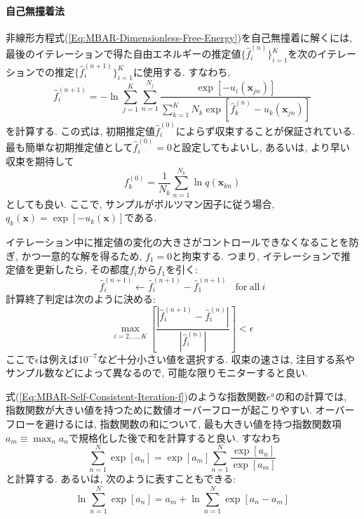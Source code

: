 \paragraph{自己無撞着法}
非線形方程式(\ref{Eq:MBAR-Dimensionless-Free-Energy})を自己無撞着に解くには, 最後のイテレーションで得た自由エネルギーの推定値$\{\hat{f}_{i}^{(n)}\}_{i=1}^{K}$を次のイテレーションでの推定$\{\hat{f}_{i}^{(n+1)}\}_{i=1}^{K}$に使用する. すなわち, 
\begin{equation}
    \hat{f}_{i}^{(n+1)}
    =
    -\ln
    \sum_{j=1}^{K} \sum_{n=1}^{N_{j}}
    \frac{
        \exp[-u_{i}(\bm{x}_{jn})]
    }{
        \sum_{k=1}^{K}
        N_{k}
        \exp[\hat{f}_{k}^{(n)} - u_{k}(\bm{x}_{jn})]
    }
\end{equation}
を計算する. 
この式は, 初期推定値$\hat{f}_{i}^{(0)}$によらず収束することが保証されている. 最も簡単な初期推定値として$\hat{f}_{i}^{(0)}=0$と設定してもよいし, あるいは, より早い収束を期待して
\begin{equation}
    f_{k}^{(0)}
    =
    \frac{1}{N_{k}}
    \sum_{n=1}^{N_{k}} \ln q(\bm{x}_{kn})
    \label{Eq:MBAR-Self-Consistent-Iteration-f}
\end{equation}
としても良い. ここで, サンプルがボルツマン因子に従う場合, $q_{k}(\bm{x}) = \exp[-u_{k}(\bm{x})]$である. 

イテレーション中に推定値の変化の大きさがコントロールできなくなることを防ぎ, かつ一意的な解を得るため, $f_{1} = 0$と拘束する. つまり, イテレーションで推定値を更新したら, その都度$f_{i}$から$f_{1}$を引く:
\begin{equation}
    \hat{f}_{i}^{(n+1)} \leftarrow \hat{f}_{i}^{(n+1)} - \hat{f}_{1}^{(n+1)}
    ~~~~\mathrm{for~all}~i
\end{equation}
計算終了判定は次のように決める:
\begin{equation}
    \max_{i=2,\ldots,K}
    \left[
        \frac{|\hat{f}_{i}^{(n+1)} - \hat{f}_{i}^{(n)}|}{|\hat{f}_{i}^{(n)}|}
    \right]
    <
    \epsilon
\end{equation}
ここで$\epsilon$は例えば$10^{-7}$など十分小さい値を選択する. 
収束の速さは, 注目する系やサンプル数などによって異なるので, 可能な限りモニターすると良い. 

式(\ref{Eq:MBAR-Self-Consistent-Iteration-f})のような指数関数$e^{a}$の和の計算では, 指数関数が大きい値を持つために数値オーバーフローが起こりやすい. 
オーバーフローを避けるには, 指数関数の和について, 最も大きい値を持つ指数関数項$a_{m} \equiv \max_{n} a_{n}$で規格化した後で和を計算すると良い. すなわち
\begin{equation}
    \sum_{n=1}^{N} \exp[a_{n}]
    =
    \exp[a_{m}]
    \sum_{n=1}^{N}
    \frac{\exp[a_{n}]}{\exp[a_{m}]}
\end{equation}
と計算する. あるいは, 次のように表すこともできる:
\begin{equation}
    \ln \sum_{n=1}^{N} \exp[a_{n}]
    =
    a_{m} + \ln \sum_{n=1}^{N} \exp[a_{n} - a_{m}]
\end{equation}

